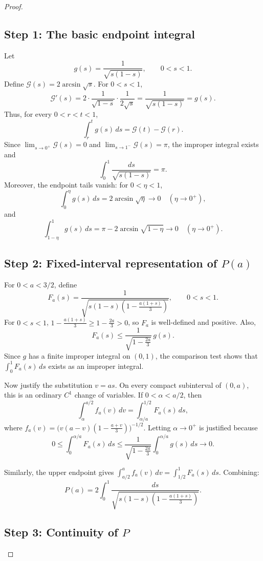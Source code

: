 \documentclass{article}
\begin{document}
\begin{proof}

\subsection*{Step 1: The basic endpoint integral}

Let
\[
g(s) = \frac{1}{\sqrt{s(1-s)}}, \qquad 0 < s < 1.
\]
Define $\mathcal{G}(s) = 2\arcsin\sqrt{s}$. For $0 < s < 1$,
\[
\mathcal{G}'(s) = 2 \cdot \frac{1}{\sqrt{1-s}} \cdot \frac{1}{2\sqrt{s}} = \frac{1}{\sqrt{s(1-s)}} = g(s).
\]
Thus, for every $0 < r < t < 1$,
\[
\int_r^t g(s)\,ds = \mathcal{G}(t) - \mathcal{G}(r).
\]
Since $\lim_{s \to 0^+} \mathcal{G}(s) = 0$ and $\lim_{s \to 1^-} \mathcal{G}(s) = \pi$, the improper integral exists and
\[
\int_0^1 \frac{ds}{\sqrt{s(1-s)}} = \pi.
\]
Moreover, the endpoint tails vanish: for $0 < \eta < 1$,
\[
\int_0^\eta g(s)\,ds = 2\arcsin\sqrt{\eta} \to 0 \quad (\eta \to 0^+),
\]
and
\[
\int_{1-\eta}^1 g(s)\,ds = \pi - 2\arcsin\sqrt{1-\eta} \to 0 \quad (\eta \to 0^+).
\]

\subsection*{Step 2: Fixed-interval representation of $P(a)$}

For $0 < a < 3/2$, define
\[
F_a(s) = \frac{1}{\sqrt{s(1-s)\!\left(1 - \frac{a(1+s)}{3}\right)}}, \qquad 0 < s < 1.
\]
For $0 < s < 1$, $1 - \frac{a(1+s)}{3} \ge 1 - \frac{2a}{3} > 0$, so $F_a$ is well-defined and positive. Also,
\[
F_a(s) \le \frac{1}{\sqrt{1 - \frac{2a}{3}}}\,g(s).
\]
Since $g$ has a finite improper integral on $(0,1)$, the comparison test shows that $\int_0^1 F_a(s)\,ds$ exists as an improper integral.

Now justify the substitution $v = as$. On every compact subinterval of $(0,a)$, this is an ordinary $C^1$ change of variables. If $0 < \alpha < a/2$, then
\[
\int_\alpha^{a/2} f_a(v)\,dv = \int_{\alpha/a}^{1/2} F_a(s)\,ds,
\]
where $f_a(v) = \bigl(v(a-v)(1 - \frac{a+v}{3})\bigr)^{-1/2}$. Letting $\alpha \to 0^+$ is justified because
\[
0 \le \int_0^{\alpha/a} F_a(s)\,ds \le \frac{1}{\sqrt{1 - \frac{2a}{3}}} \int_0^{\alpha/a} g(s)\,ds \longrightarrow 0.
\]

Similarly, the upper endpoint gives $\int_{a/2}^a f_a(v)\,dv = \int_{1/2}^1 F_a(s)\,ds$. Combining:
\[
P(a) = 2\int_0^1 \frac{ds}{\sqrt{s(1-s)\!\left(1 - \frac{a(1+s)}{3}\right)}}.
\]

\subsection*{Step 3: Continuity of $P$}


\end{proof}
\end{document}
